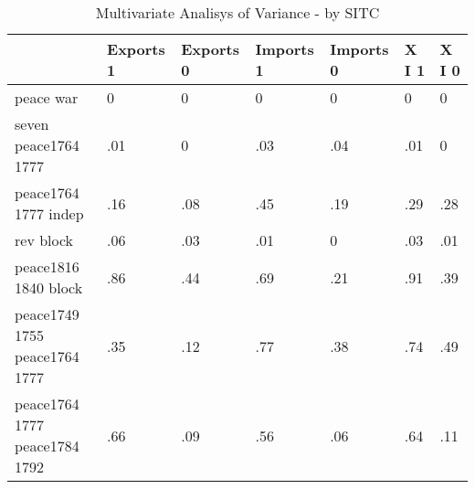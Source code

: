 \begin{table}[htbp]
\caption{\label{tab:manova_test_sitc} Multivariate Analisys of Variance - by SITC}\centering\medskip
\begin{tabular}{|l|l|l|l|l|l|l|}\hline  
 & Exports 1  & Exports 0  & Imports 1  & Imports 0  & X I 1  & X I 0  \\ \hline  
peace war & 0 & 0 & 0 & 0 & 0 & 0 \\ \hline 
seven peace1764 1777 & .01 & 0 & .03 & .04 & .01 & 0 \\ \hline 
peace1764 1777 indep & .16 & .08 & .45 & .19 & .29 & .28 \\ \hline 
rev block & .06 & .03 & .01 & 0 & .03 & .01 \\ \hline 
peace1816 1840 block & .86 & .44 & .69 & .21 & .91 & .39 \\ \hline 
peace1749 1755 peace1764 1777 & .35 & .12 & .77 & .38 & .74 & .49 \\ \hline 
peace1764 1777 peace1784 1792 & .66 & .09 & .56 & .06 & .64 & .11 \\ \hline 
  \end{tabular}
\end{table}
